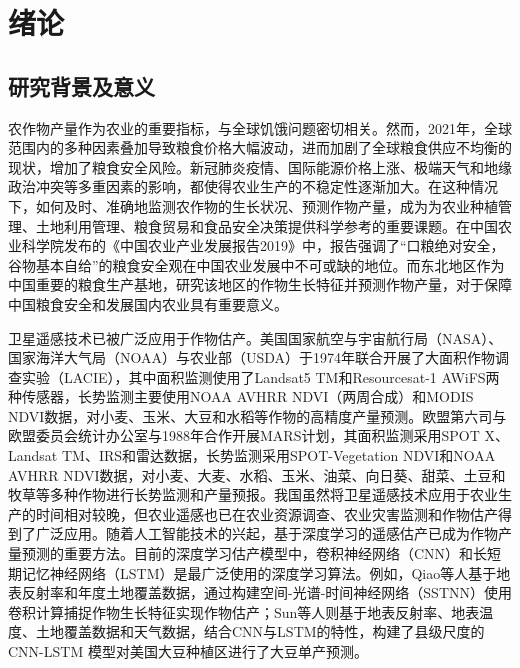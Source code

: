 \cleardoublepage

\section{绪论}

\subsection{研究背景及意义}

\par 农作物产量作为农业的重要指标，与全球饥饿问题密切相关。然而，2021年，全球范围内的多种因素叠加导致粮食价格大幅波动，进而加剧了全球粮食供应不均衡的现状，增加了粮食安全风险。新冠肺炎疫情、国际能源价格上涨、极端天气和地缘政治冲突等多重因素的影响，都使得农业生产的不稳定性逐渐加大。在这种情况下，如何及时、准确地监测农作物的生长状况、预测作物产量，成为为农业种植管理、土地利用管理、粮食贸易和食品安全决策提供科学参考的重要课题。在中国农业科学院发布的《中国农业产业发展报告2019》中，报告强调了“口粮绝对安全，谷物基本自给”的粮食安全观在中国农业发展中不可或缺的地位\cite{中国农业科学院2019中国农业产业发展报告}。而东北地区作为中国重要的粮食生产基地，研究该地区的作物生长特征并预测作物产量，对于保障中国粮食安全和发展国内农业具有重要意义。

\par 卫星遥感技术已被广泛应用于作物估产。美国国家航空与宇宙航行局（NASA）、国家海洋大气局（NOAA）与农业部（USDA）于1974年联合开展了大面积作物调查实验（LACIE），其中面积监测使用了Landsat5 TM和Resourcesat-1 AWiFS两种传感器，长势监测主要使用NOAA AVHRR NDVI（两周合成）和MODIS NDVI数据，对小麦、玉米、大豆和水稻等作物的高精度产量预测\cite{erickson1984lacie}。欧盟第六司与欧盟委员会统计办公室与1988年合作开展MARS计划，其面积监测采用SPOT X、Landsat TM、IRS和雷达数据，长势监测采用SPOT-Vegetation NDVI和NOAA AVHRR NDVI数据，对小麦、大麦、水稻、玉米、油菜、向日葵、甜菜、土豆和牧草等多种作物进行长势监测和产量预报\cite{刘海启1999欧盟MARS}。我国虽然将卫星遥感技术应用于农业生产的时间相对较晚，但农业遥感也已在农业资源调查、农业灾害监测和作物估产得到了广泛应用。随着人工智能技术的兴起，基于深度学习的遥感估产已成为作物产量预测的重要方法。目前的深度学习估产模型中，卷积神经网络（CNN）和长短期记忆神经网络（LSTM）是最广泛使用的深度学习算法。例如，Qiao等人基于地表反射率和年度土地覆盖数据，通过构建空间-光谱-时间神经网络（SSTNN）使用卷积计算捕捉作物生长特征实现作物估产\cite{qiao2021crop}；Sun等人则基于地表反射率、地表温度、土地覆盖数据和天气数据，结合CNN与LSTM的特性，构建了县级尺度的 CNN-LSTM 模型对美国大豆种植区进行了大豆单产预测\cite{sun2019county}。

